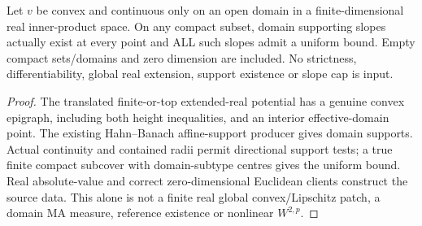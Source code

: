 \begin{lemma}
  \label{lem:domain-c0-subgradients}
  \leanok
  Let $v$ be convex and continuous only on an open domain in a finite-dimensional
  real inner-product space. On any compact subset, domain supporting slopes
  actually exist at every point and ALL such slopes admit a uniform bound.
  Empty compact sets/domains and zero dimension are included. No strictness,
  differentiability, global real extension, support existence or slope cap is input.
\end{lemma}
\begin{proof}
  \leanok
  The translated finite-or-top extended-real potential has a genuine convex
  epigraph, including both height inequalities, and an interior effective-domain
  point. The existing Hahn--Banach affine-support producer gives domain supports.
  Actual continuity and contained radii permit directional support tests; a true
  finite compact subcover with domain-subtype centres gives the uniform bound.
  Real absolute-value and correct zero-dimensional Euclidean clients construct
  the source data. This alone is not a finite real global convex/Lipschitz patch,
  a domain MA measure, reference existence or nonlinear $W^{2,p}$.
\end{proof}


